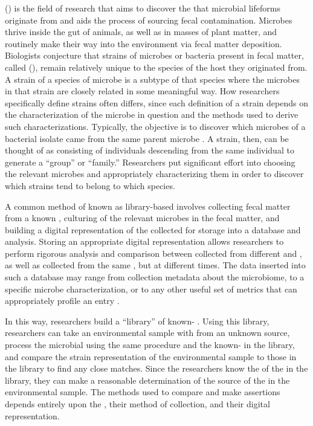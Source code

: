 \MSTlong{} (\mst{}) is the field of research that aims to discover the \spec{} that microbial lifeforms originate from
and
aids the process of sourcing fecal contamination. 
Microbes thrive inside the gut of animals, as well as in masses of plant matter, and routinely make their way into the environment via fecal matter deposition.
Biologists conjecture that strains of microbes or bacteria present in fecal matter, called \fiblong{} (\fib{}), remain relatively unique to the species of the host they originated from.
A strain of a species of microbe is a subtype of that species where the microbes in that strain are closely related in some meaningful way.
How researchers specifically define strains often differs, since each definition of a strain depends on the characterization of the microbe in question and the methods used to derive such characterizations.
Typically, the objective is to discover which microbes of a bacterial isolate came from the same parent microbe \cite{Li892}.
A strain, then, can be thought of as consisting of individuals descending from the same individual to generate a ``group'' or ``family.''
Researchers put significant effort into choosing the relevant microbes and appropriately characterizing them in order to discover which strains tend to belong to which species.

A common method of \mst{} known as library-based \mst{} involves collecting fecal matter from a known \spec{}, culturing \isols{} of the relevant microbes in the fecal matter, and building a digital representation of the collected \isols{} for storage into a database and analysis.
Storing an appropriate digital representation allows researchers to perform rigorous analysis and comparison between \fib{} \isols{} collected from different \hosts{} and \spec{}, as well as \isols{} collected from the same \host{}, but at different times.
The data inserted into such a database may range from collection metadata about the microbiome, to a specific microbe characterization, or to any other useful set of metrics that can appropriately profile an entry \cite{ritter2003assessment}.

In this way, researchers build a ``library'' of known-\spec{} \isols{}.
Using this library, researchers can take an environmental sample with \fib{} from an unknown source, process the microbial \isols{} using the same procedure and the known-\spec{} \isols{} in the library, and compare the strain representation of the environmental sample to those in the library to find any close matches.
Since the researchers know the \spec{} of the \isols{} in the library, they can make a reasonable determination of the source of the \isols{} in the environmental sample.
The methods used to compare \isols{} and make assertions depends entirely upon the \fib{}, their method of collection, and their digital representation.

